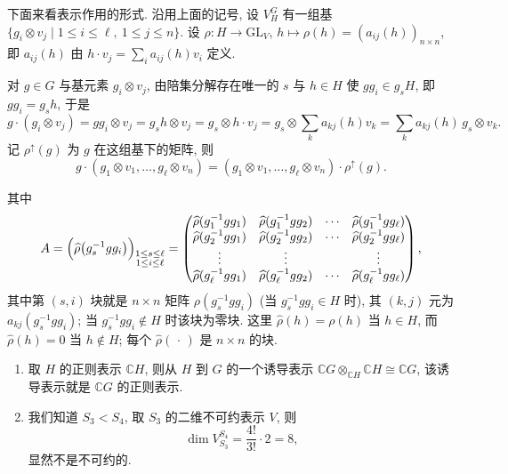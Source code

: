 下面来看表示作用的形式. 沿用上面的记号, 设 $V_H^G$ 有一组基
$\{g_i\otimes v_j\mid 1\le i\le\ell,\ 1\le j\le n\}$.
设 $\rho\colon H\to\mathrm{GL}_V$, $h\mapsto\rho(h)=(a_{ij}(h))_{n\times n}$, 即
$a_{ij}(h)$ 由 $h\cdot v_j=\sum_i a_{ij}(h)v_i$ 定义.

对 $g\in G$ 与基元素 $g_i\otimes v_j$, 由陪集分解存在唯一的 $s$ 与 $h\in H$ 使
$gg_i\in g_sH$, 即 $gg_i=g_sh$, 于是
\[
  g\cdot(g_i\otimes v_j)=gg_i\otimes v_j=g_sh\otimes v_j=g_s\otimes h\cdot v_j
  =g_s\otimes\sum_k a_{kj}(h)v_k=\sum_k a_{kj}(h)\,g_s\otimes v_k .
\]
记 $\rho^{\uparrow}(g)$ 为 $g$ 在这组基下的矩阵, 则
\[
  g\cdot(g_1\otimes v_1,\dots,g_\ell\otimes v_n)
  =(g_1\otimes v_1,\dots,g_\ell\otimes v_n)\cdot\rho^{\uparrow}(g).
\]

其中
\[
  A=\Bigl(\widehat\rho\bigl(g_s^{-1}gg_i\bigr)\Bigr)_{\substack{1\le s\le\ell\\ 1\le i\le\ell}}
  =
  \begin{pmatrix}
    \widehat\rho(g_1^{-1}gg_1) & \widehat\rho(g_1^{-1}gg_2) & \cdots & \widehat\rho(g_1^{-1}gg_\ell)\\
    \widehat\rho(g_2^{-1}gg_1) & \widehat\rho(g_2^{-1}gg_2) & \cdots & \widehat\rho(g_2^{-1}gg_\ell)\\
    \vdots & \vdots & & \vdots\\
    \widehat\rho(g_\ell^{-1}gg_1) & \widehat\rho(g_\ell^{-1}gg_2) & \cdots & \widehat\rho(g_\ell^{-1}gg_\ell)
  \end{pmatrix},
\]
其中第 $(s,i)$ 块就是 $n\times n$ 矩阵 $\rho(g_s^{-1}gg_i)$ (当 $g_s^{-1}gg_i\in H$ 时), 其 $(k,j)$ 元为 $a_{kj}(g_s^{-1}gg_i)$; 当 $g_s^{-1}gg_i\notin H$ 时该块为零块.
这里 $\widehat\rho(h)=\rho(h)$ 当 $h\in H$, 而 $\widehat\rho(h)=0$ 当 $h\notin H$;
每个 $\widehat\rho(\,\cdot\,)$ 是 $n\times n$ 的块.

\begin{example}\label{ex:induced-examples}
\mbox{}\par\vspace{-0.2em}
\begin{enumerate}
\item 取 $H$ 的正则表示 $\mathbb{C}H$, 则从 $H$ 到 $G$ 的一个诱导表示
$\mathbb{C}G\otimes_{\mathbb{C}H}\mathbb{C}H\cong\mathbb{C}G$, 该诱导表示就是 $\mathbb{C}G$ 的正则表示.
\item 我们知道 $S_3<S_4$, 取 $S_3$ 的二维不可约表示 $V$, 则
\[
  \dim V_{S_3}^{S_4}=\frac{4!}{3!}\cdot 2=8,
\]
显然不是不可约的.
\end{enumerate}
\end{example}

